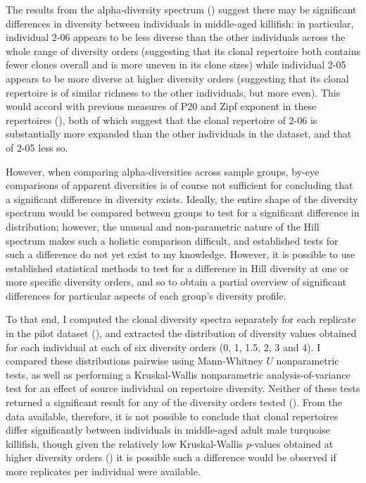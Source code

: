 The results from the alpha-diversity spectrum () suggest there may be significant differences in diversity between individuals in middle-aged killifish: in particular, individual 2-06 appears to be less diverse than the other individuals across the whole range of diversity orders (suggesting that its clonal repertoire both contains fewer clones overall and is more uneven in its clone sizes) while individual 2-05 appears to be more diverse at higher diversity orders (suggesting that its clonal repertoire is of similar richness to the other individuals, but more even). This would accord with previous measures of P20 and Zipf exponent in these repertoires (), both of which suggest that the clonal repertoire of 2-06 is substantially more expanded than the other individuals in the dataset, and that of 2-05 less so.

However, when comparing alpha-diversities across sample groups, by-eye comparisons of apparent diversities is of course not sufficient for concluding that a significant difference in diversity exists. Ideally, the entire shape of the diversity spectrum would be compared between groups to test for a significant difference in distribution; however, the unusual and non-parametric nature of the Hill spectrum makes such a holistic comparison difficult, and established tests for such a difference do not yet exist to my knowledge. However, it is possible to use established statistical methods to test for a difference in Hill diversity at one or more specific diversity orders, and so to obtain a partial overview of significant differences for particular aspects of each group's diversity profile. 

To that end, I computed the clonal diversity spectra separately for each replicate in the pilot dataset (), and extracted the distribution of diversity values obtained for each individual at each of six diversity orders (0, 1, 1.5, 2, 3 and 4). I compared these distributions pairwise using Mann-Whitney $U$ nonparametric tests, as well as performing a Kruskal-Wallis nonparametric analysis-of-variance test for an effect of source individual on repertoire diversity. Neither of these tests returned a significant result for any of the diversity orders tested (). From the data available, therefore, it is not possible to conclude that clonal repertoires differ significantly between individuals in middle-aged adult male turquoise killifish, though given the relatively low Kruskal-Wallis $p$-values obtained at higher diversity orders () it is possible such a difference would be observed if more replicates per individual were available.


